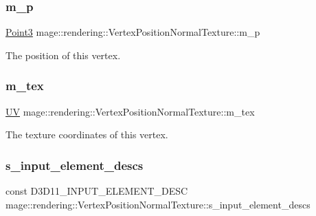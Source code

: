 \subsubsection{\texorpdfstring{m\+\_\+p}{m\_p}}
{\footnotesize\ttfamily \hyperlink{structmage_1_1_point3}{Point3} mage\+::rendering\+::\+Vertex\+Position\+Normal\+Texture\+::m\+\_\+p}

The position of this vertex. \hypertarget{structmage_1_1rendering_1_1_vertex_position_normal_texture_a8390daa0e3fd706ff42b32a62a935c3c}{}\label{structmage_1_1rendering_1_1_vertex_position_normal_texture_a8390daa0e3fd706ff42b32a62a935c3c} 
\subsubsection{\texorpdfstring{m\+\_\+tex}{m\_tex}}
{\footnotesize\ttfamily \hyperlink{structmage_1_1_u_v}{UV} mage\+::rendering\+::\+Vertex\+Position\+Normal\+Texture\+::m\+\_\+tex}

The texture coordinates of this vertex. \hypertarget{structmage_1_1rendering_1_1_vertex_position_normal_texture_a5f3ec0cb5a7957fda248bad573caee44}{}\label{structmage_1_1rendering_1_1_vertex_position_normal_texture_a5f3ec0cb5a7957fda248bad573caee44} 
\subsubsection{\texorpdfstring{s\+\_\+input\+\_\+element\+\_\+descs}{s\_input\_element\_descs}}
{\footnotesize\ttfamily const D3\+D11\+\_\+\+I\+N\+P\+U\+T\+\_\+\+E\+L\+E\+M\+E\+N\+T\+\_\+\+D\+E\+SC mage\+::rendering\+::\+Vertex\+Position\+Normal\+Texture\+::s\+\_\+input\+\_\+element\+\_\+descs\hspace{0.3cm}{\ttfamily [static]}}

